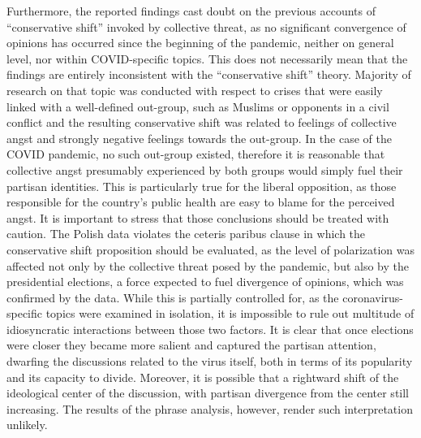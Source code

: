\documentclass{article}
\begin{document}
	Furthermore, the reported findings cast doubt on the previous accounts of “conservative shift” \citep{bonanno2006} invoked by collective threat, as no significant convergence of opinions has occurred since the beginning of the pandemic, neither on general level, nor within COVID-specific topics. This does not necessarily mean that the findings are entirely inconsistent with the “conservative shift” theory. Majority of research on that topic was conducted with respect to crises that were easily linked with a well-defined out-group, such as Muslims \citep{bonanno2006, vandevyver2016} or opponents in a civil conflict \citep{porat2019} and the resulting conservative shift was related to feelings of collective angst and strongly negative feelings towards the out-group. In the case of the COVID pandemic, no such out-group existed, therefore it is reasonable that collective angst presumably experienced by both groups would simply fuel their partisan identities. This is particularly true for the liberal opposition, as those responsible for the country’s public health are easy to blame for the perceived angst. It is important to stress that those conclusions should be treated with caution. The Polish data violates the ceteris paribus clause in which the conservative shift proposition should be evaluated, as the level of polarization was affected not only by the collective threat posed by the pandemic, but also by the presidential elections, a force expected to fuel divergence of opinions, which was confirmed by the data. While this is partially controlled for, as the coronavirus-specific topics were examined in isolation, it is impossible to rule out multitude of idiosyncratic interactions between those two factors. It is clear that once elections were closer they became more salient and captured the partisan attention, dwarfing the discussions related to the virus itself, both in terms of its popularity and its capacity to divide. Moreover, it is possible that a rightward shift of the ideological center of the discussion, with partisan divergence from the center still increasing. The results of the phrase analysis, however, render such interpretation unlikely.
	
\end{document}
